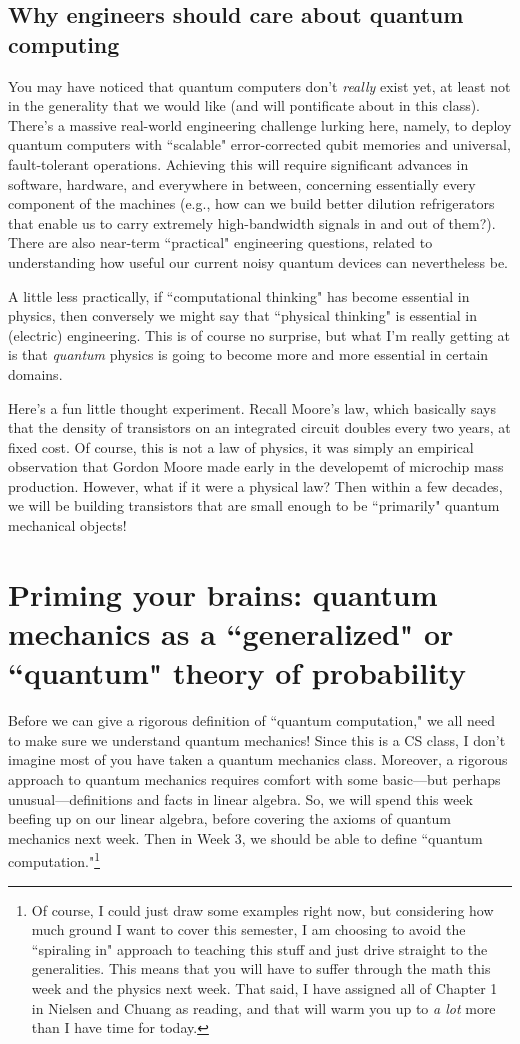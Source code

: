 \documentclass{article}
\begin{document}
\subsection{Why engineers should care about quantum computing} 
You may have noticed that quantum computers don't \emph{really} exist yet, at least not in the generality that we would like (and will pontificate about in this class).  There's a massive real-world engineering challenge lurking here, namely, to deploy quantum computers with ``scalable" error-corrected qubit memories and universal, fault-tolerant operations.  Achieving this will require significant advances in software, hardware, and everywhere in between, concerning essentially every component of the machines (e.g., how can we build better dilution refrigerators that enable us to carry extremely high-bandwidth signals in and out of them?).  There are also near-term ``practical" engineering questions, related to understanding how useful our current noisy quantum devices can nevertheless be.

A little less practically, if ``computational thinking" has become essential in physics, then conversely we might say that ``physical thinking" is essential in (electric) engineering.  This is of course no surprise, but what I'm really getting at is that \emph{quantum} physics is going to become more and more essential in certain domains.

Here's a fun little thought experiment.  Recall Moore's law, which basically says that the density of transistors on an integrated circuit doubles every two years, at fixed cost.  Of course, this is not a law of physics, it was simply an empirical observation that Gordon Moore made early in the developemt of microchip mass production.  However, what if it were a physical law?  Then within a few decades, we will be building transistors that are small enough to be ``primarily" quantum mechanical objects!


\section{Priming your brains: quantum mechanics as a ``generalized" or ``quantum" theory of probability}
Before we can give a rigorous definition of ``quantum computation," we all need to make sure we understand quantum mechanics!  Since this is a CS class, I don't imagine most of you have taken a quantum mechanics class.  Moreover, a rigorous approach to quantum mechanics requires comfort with some basic---but perhaps unusual---definitions and facts in linear algebra.  So, we will spend this week beefing up on our linear algebra, before covering the axioms of quantum mechanics next week.  Then in Week 3, we should be able to define ``quantum computation."\footnote{Of course, I could just draw some examples right now, but considering how much ground I want to cover this semester, I am choosing to avoid the ``spiraling in" approach to teaching this stuff and just drive straight to the generalities.  This means that you will have to suffer through the math this week and the physics next week.  That said, I have assigned all of Chapter 1 in Nielsen and Chuang as reading, and that will warm you up to \emph{a lot} more than I have time for today.}
\end{document}

